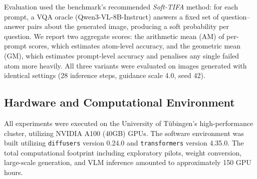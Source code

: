 Evaluation used the benchmark's recommended \emph{Soft-TIFA} method: for each prompt, a VQA oracle (Qwen3-VL-8B-Instruct) answers a fixed set of question--answer pairs about the generated image, producing a soft probability per question. We report two aggregate scores: the arithmetic mean (AM) of per-prompt scores, which estimates atom-level accuracy, and the geometric mean (GM), which estimates prompt-level accuracy and penalises any single failed atom more heavily. All three variants were evaluated on images generated with identical settings (28 inference steps, guidance scale 4.0, seed 42).

\subsection{Hardware and Computational Environment}
All experiments were executed on the University of Tübingen's high-performance cluster, utilizing NVIDIA A100 (40GB) GPUs. The software environment was built utilizing \texttt{diffusers} version 0.24.0 and \texttt{transformers} version 4.35.0. The total computational footprint including exploratory pilots, weight conversion, large-scale generation, and VLM inference amounted to approximately 150 GPU hours.